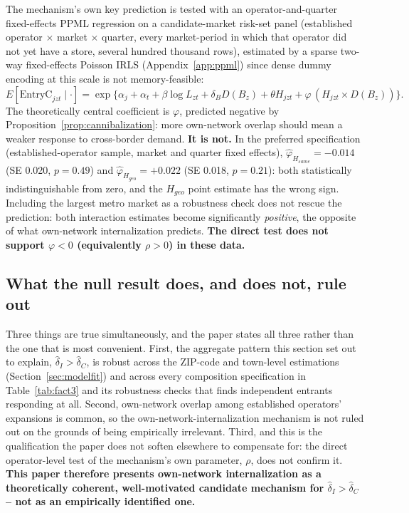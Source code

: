 \documentclass[english,12pt]{article}
\begin{document}
The mechanism's own key prediction is tested with an operator-and-quarter fixed-effects PPML regression on a candidate-market risk-set panel (established operator $\times$ market $\times$ quarter, every market-period in which that operator did not yet have a store, several hundred thousand rows), estimated by a sparse two-way fixed-effects Poisson IRLS (Appendix~\ref{app:ppml}) since dense dummy encoding at this scale is not memory-feasible:
\[
E[\text{EntryC}_{jzt}\mid\cdot] = \exp\{\alpha_j + \alpha_t + \beta\log L_{zt} + \delta_B D(B_z) + \theta H_{jzt} + \varphi\,(H_{jzt}\times D(B_z))\}.
\]
The theoretically central coefficient is $\varphi$, predicted negative by Proposition~\ref{prop:cannibalization}: more own-network overlap should mean a weaker response to cross-border demand. \textbf{It is not.} In the preferred specification (established-operator sample, market and quarter fixed effects), $\hat\varphi_{H_{same}}=-0.014$ (SE 0.020, $p=0.49$) and $\hat\varphi_{H_{geo}}=+0.022$ (SE 0.018, $p=0.21$): both statistically indistinguishable from zero, and the $H_{geo}$ point estimate has the wrong sign. Including the largest metro market as a robustness check does not rescue the prediction: both interaction estimates become significantly \emph{positive}, the opposite of what own-network internalization predicts. \textbf{The direct test does not support $\varphi<0$ (equivalently $\rho>0$) in these data.}

\subsection{What the null result does, and does not, rule out}
\label{sec:mechanism-conclusion}

Three things are true simultaneously, and the paper states all three rather than the one that is most convenient. First, the aggregate pattern this section set out to explain, $\hat\delta_I>\hat\delta_C$, is robust across the ZIP-code and town-level estimations (Section~\ref{sec:modelfit}) and across every composition specification in Table~\ref{tab:fact3} and its robustness checks that finds independent entrants responding at all. Second, own-network overlap among established operators' expansions is common, so the own-network-internalization mechanism is not ruled out on the grounds of being empirically irrelevant. Third, and this is the qualification the paper does not soften elsewhere to compensate for: the direct operator-level test of the mechanism's own parameter, $\rho$, does not confirm it. \textbf{This paper therefore presents own-network internalization as a theoretically coherent, well-motivated candidate mechanism for $\hat\delta_I>\hat\delta_C$ -- not as an empirically identified one.}
\end{document}
